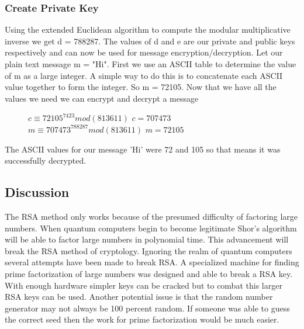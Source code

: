 \documentclass[conference]{IEEEtran}
\begin{document}
\subsubsection{Create Private Key} 
Using the extended Euclidean algorithm to compute the modular multiplicative inverse we get d = 788287. The values of d and e are our private and public keys respectively and can now be used for message encryption/decryption. \newline \indent
Let our plain text message m = "Hi". First we use an ASCII table to determine the value of m as a large integer. A simple way to do this is to concatenate each ASCII value together to form the integer. So m = 72105. Now that we have all the values we need we can encrypt and decrypt a message
\begin{figure}[h]
	\begin{center}
		$c \equiv {72105}^{7423} mod (813611)$ \newline
		$c = 707473$ \newline
		$m \equiv {707473}^{788287} mod (813611)$ \newline
		$m = 72105$ \newline
	\end{center}
\end{figure}

The ASCII values for our message 'Hi' were 72 and 105 so that means it was successfully decrypted. 

\subsection{Discussion}
The RSA method only works because of the presumed difficulty of factoring large numbers. When quantum computers begin to become legitimate Shor's algorithm will be able to factor large numbers in polynomial time. This advancement will break the RSA method of cryptology. \newline
\indent Ignoring the realm of quantum computers several attempts have been made to break RSA. A specialized machine for finding prime factorization of large numbers was designed and able to break a RSA key. With enough hardware simpler keys can be cracked but to combat this larger RSA keys can be used. 
\newline \indent
Another potential issue is that the random number generator may not always be 100 percent random. If someone was able to guess the correct seed then the work for prime factorization would be much easier.


\end{document}
